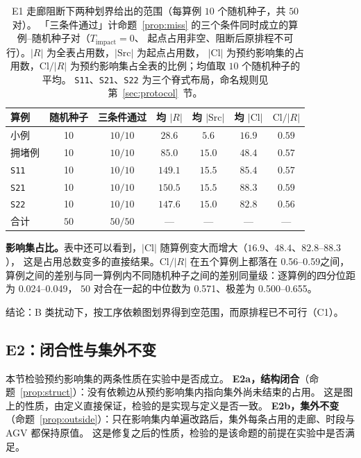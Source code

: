 \documentclass[manuscript,screen,review]{acmart}
\newcommand{\NSeeds}{10}
\newcommand{\NPairs}{50}
\newcommand{\PassMiss}{\NPairs/\NPairs}      %
\newcommand{\EoneCloLo}{0.56}
\newcommand{\EoneCloHi}{0.59}
\newcommand{\EoneFracIqrLo}{0.024}  %
\newcommand{\EoneFracIqrHi}{0.049}  %
\newcommand{\EoneFracMed}{0.571}    %
\newcommand{\EoneFracMin}{0.500}    %
\newcommand{\EoneFracMax}{0.655}    %
\begin{document}
\begin{table}[t]
\centering
\caption{E1 走廊阻断下两种划界给出的范围（每算例 \(\NSeeds\) 个随机种子，共 \(\NPairs\) 对）。
「三条件通过」计命题~\ref{prop:miss} 的三个条件同时成立的算例--随机种子对（\(T_{\mathrm{impact}}=0\)、
起点占用非空、阻断后原排程不可行）。\(|R|\) 为全表占用数，\(|\mathrm{Src}|\) 为起点占用数，
\(|\mathrm{Cl}|\) 为预约影响集的占用数，\(\mathrm{Cl}/|R|\) 为预约影响集占全表的比例；均值取 \(\NSeeds\) 个随机种子的平均。
\texttt{S11}、\texttt{S21}、\texttt{S22} 为三个脊式布局，命名规则见第~\ref{sec:protocol}~节。}
\label{tab:e1}
\small
\begin{tabular}{@{}lcccccc@{}}
\toprule
算例 & 随机种子 & 三条件通过 & 均 \(|R|\) & 均 \(|\mathrm{Src}|\)
 & 均 \(|\mathrm{Cl}|\) & \(\mathrm{Cl}/|R|\) \\
\midrule
小例   & 10 & \(10/10\) & \(28.6\)  & \(5.6\)  & \(16.9\) & \(0.59\) \\
拥堵例 & 10 & \(10/10\) & \(85.0\)  & \(15.0\) & \(48.4\) & \(0.57\) \\
\texttt{S11}  & 10 & \(10/10\) & \(149.1\) & \(15.5\) & \(85.4\) & \(0.57\) \\
\texttt{S21}    & 10 & \(10/10\) & \(150.5\) & \(15.5\) & \(88.3\) & \(0.59\) \\
\texttt{S22}     & 10 & \(10/10\) & \(147.6\) & \(15.0\) & \(82.8\) & \(0.56\) \\
\midrule
合计 & \(\NPairs\) & \(\PassMiss\) & --- & --- & --- & --- \\
\bottomrule
\end{tabular}
\end{table}

\textbf{影响集占比。}表中还可以看到，\(|\mathrm{Cl}|\) 随算例变大而增大（\(16.9\)、\(48.4\)、\(82.8\)--\(88.3\)），
这是占用总数变多的直接结果。\(\mathrm{Cl}/|R|\) 在五个算例上都落在 \EoneCloLo--\EoneCloHi 之间，
算例之间的差别与同一算例内不同随机种子之间的差别同量级：逐算例的四分位距为 \EoneFracIqrLo--\EoneFracIqrHi，
\(\NPairs\) 对合在一起的中位数为 \EoneFracMed、极差为 \EoneFracMin--\EoneFracMax。

结论：B 类扰动下，按工序依赖图划界得到空范围，而原排程已不可行（C1）。

\subsection{E2：闭合性与集外不变}
\label{sec:e2}

本节检验预约影响集的两条性质在实验中是否成立。
\textbf{E2a，结构闭合}（命题~\ref{prop:struct}）：没有依赖边从预约影响集内指向集外尚未结束的占用。
这是图上的性质，由定义直接保证，检验的是实现与定义是否一致。
\textbf{E2b，集外不变}（命题~\ref{prop:outside}）：只在影响集内单遍改路后，集外每条占用的走廊、时段与 AGV 都保持原值。
这是修复之后的性质，检验的是该命题的前提在实验中是否满足。
\end{document}

